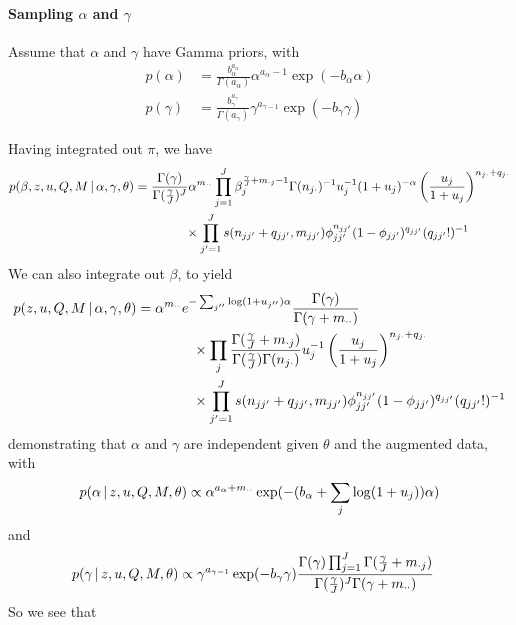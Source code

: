 \paragraph{Sampling $\alpha$ and $\gamma$}
\label{sec:sampling-alpha} Assume that $\alpha$ and $\gamma$ have
Gamma priors, with
\begin{align}
  \label{eq:42} p(\alpha) &=
\frac{b_{\alpha}^{a_{\alpha}}}{\Gamma(a_{\alpha})} \alpha^{a_{\alpha}
- 1} \exp(-b_{\alpha}\alpha) \\ p(\gamma) &=
\frac{b_{\gamma}^{a_\gamma}}{\Gamma(a_{\gamma})} \gamma^{a_{\gamma -
1}} \exp(-b_{\gamma}\gamma)
\end{align}

Having integrated out $\pi$, we have
\begin{align} p(\beta, z, u, Q, M \, \vert \, \alpha, \gamma, \theta) &=
\frac{\Gamma(\gamma)}{\Gamma(\frac{\gamma}{J})^J}
\alpha^{m_{\cdot\cdot}} \prod_{j=1}^J \beta_j^{\frac{\gamma}{J} +
m_{\cdot j} - 1}\Gamma(n_{j\cdot})^{-1} u_j^{-1}(1+u_j)^{-\alpha}
\left(\frac{u_j}{1+u_j}\right)^{n_{j\cdot} + q_{j\cdot}} \\ &\qquad
\qquad \times \prod_{j' = 1}^J s(n_{jj'} + q_{jj'}, m_{jj'})
\phi_{jj'}^{n_{jj'}}(1-\phi_{jj'})^{q_{jj'}} (q_{jj'}!)^{-1}
\end{align} We can also integrate out $\beta$, to yield
\begin{align} p(z, u, Q, M \, \vert \, \alpha, \gamma, \theta) &=
\alpha^{m_{\cdot\cdot}} e^{-\sum_{j''} \log(1+u_{j''}) \alpha}
\frac{\Gamma(\gamma)}{\Gamma(\gamma + m_{\cdot\cdot})} \\ &\qquad
\qquad \times \prod_j \frac{\Gamma(\frac{\gamma}{J} + m_{\cdot
j})}{\Gamma(\frac{\gamma}{J}) \Gamma(n_{j\cdot})} u_j^{-1}
\left(\frac{u_j}{1+u_j}\right)^{n_{j\cdot} + q_{j\cdot}} \\ &\qquad
\qquad \times \prod_{j' = 1}^J s(n_{jj'} + q_{jj'}, m_{jj'})
\phi_{jj'}^{n_{jj'}}(1-\phi_{jj'})^{q_{jj'}} (q_{jj'}!)^{-1}
\end{align} demonstrating that $\alpha$ and $\gamma$ are independent
given $\theta$ and the augmented data, with
\begin{equation}
  \label{eq:43} p(\alpha \, \vert \, z, u, Q, M, \theta) \propto
\alpha^{a_{\alpha} + m_{\cdot\cdot}}\exp(-(b_\alpha +
\sum_{j}\log(1+u_j))\alpha)
\end{equation} and
\begin{align}
  \label{eq:8} p(\gamma \, \vert \, z, u, Q, M, \theta) &\propto
\gamma^{a_{\gamma - 1}} \exp(-b_{\gamma}\gamma)
\frac{\Gamma(\gamma)\prod_{j=1}^J \Gamma(\frac{\gamma}{J} + m_{\cdot
j})}{\Gamma(\frac{\gamma}{J})^J\Gamma(\gamma + m_{\cdot\cdot})}
\end{align} So we see that

